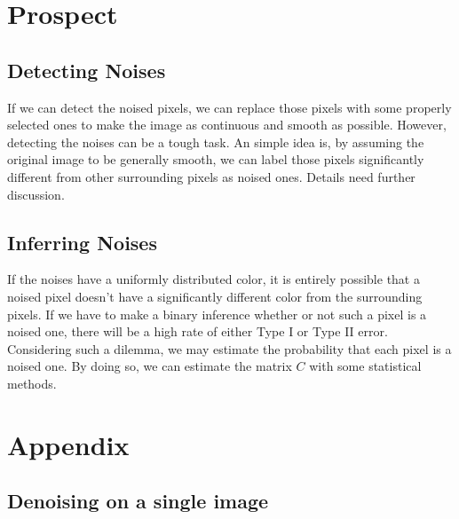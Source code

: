 \documentclass[12pt]{article}
\begin{document}
	\section{Prospect}
	
	\subsection{Detecting Noises}
	
	If we can detect the noised pixels, we can replace those pixels with some properly selected ones to make the image as continuous and smooth as possible. However, detecting the noises can be a tough task. An simple idea is, by assuming the original image to be generally smooth, we can label those pixels significantly different from other surrounding pixels as noised ones. Details need further discussion.
	
	\subsection{Inferring Noises}
	
	If the noises have a uniformly distributed color, it is entirely possible that a noised pixel doesn't have a significantly different color from the surrounding pixels. If we have to make a binary inference whether or not such a pixel is a noised one, there will be a high rate of either Type I or Type II error. Considering such a dilemma, we may estimate the probability that each pixel is a noised one. By doing so, we can estimate the matrix $C$ with some statistical methods.
	
	\newpage
	
	\section{Appendix}
	
	\subsection{Denoising on a single image}
	
\end{document}
